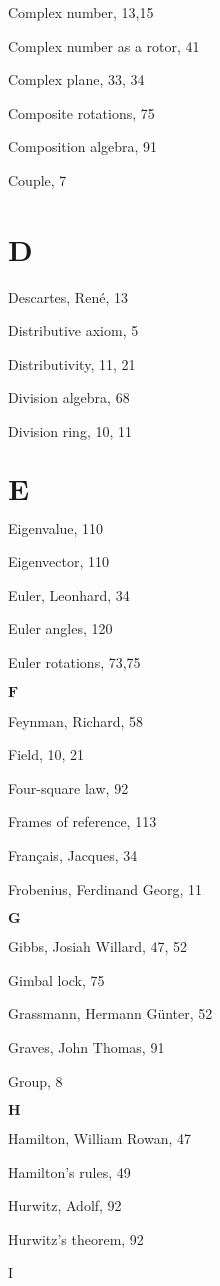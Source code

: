   Complex number, 13,15
  
  Complex number as a rotor, 41
  
  Complex plane, 33, 34
  
  Composite rotations, 75
  
  Composition algebra, 91
  
  Couple, 7
  
  \section{D}
  Descartes, René, 13
  
  Distributive axiom, 5
  
  Distributivity, 11, 21
  
  Division algebra, 68
  
  Division ring, 10, 11
  
  \section{$\mathbf{E}$}
  Eigenvalue, 110
  
  Eigenvector, 110
  
  Euler, Leonhard, 34
  
  Euler angles, 120
  
  Euler rotations, 73,75
  
  $\mathbf{F}$
  
  Feynman, Richard, 58
  
  Field, 10, 21
  
  Four-square law, 92
  
  Frames of reference, 113
  
  Français, Jacques, 34
  
  Frobenius, Ferdinand Georg, 11
  
  $\mathbf{G}$
  
  Gibbs, Josiah Willard, 47, 52
  
  Gimbal lock, 75
  
  Grassmann, Hermann Günter, 52
  
  Graves, John Thomas, 91
  
  Group, 8
  
  $\mathbf{H}$
  
  Hamilton, William Rowan, 47
  
  Hamilton's rules, 49
  
  Hurwitz, Adolf, 92
  
  Hurwitz's theorem, 92
  
  I
  
